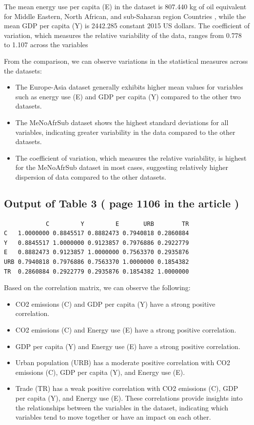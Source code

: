 \documentclass[
  11pt,
]{article}
\providecommand{\tightlist}{%
  \setlength{\itemsep}{0pt}\setlength{\parskip}{0pt}}\usepackage{longtable,booktabs,array}
\begin{document}
The mean energy use per capita (E) in the dataset is 807.440 kg of oil
equivalent for Middle Eastern, North African, and sub-Saharan region
Countries , while the mean GDP per capita (Y) is 2442.285 constant 2015
US dollars. The coefficient of variation, which measures the relative
variability of the data, ranges from 0.778 to 1.107 across the variables

From the comparison, we can observe variations in the statistical
measures across the datasets:

\begin{itemize}
\tightlist
\item
  The Europe-Asia dataset generally exhibits higher mean values for
  variables such as energy use (E) and GDP per capita (Y) compared to
  the other two datasets.
\item
  The MeNoAfrSub dataset shows the highest standard deviations for all
  variables, indicating greater variability in the data compared to the
  other datasets.
\item
  The coefficient of variation, which measures the relative variability,
  is highest for the MeNoAfrSub dataset in most cases, suggesting
  relatively higher dispersion of data compared to the other datasets.
\end{itemize}

\hypertarget{output-of-table-3-page-1106-in-the-article}{%
\subsection{Output of Table 3 ( page 1106 in the article
)}\label{output-of-table-3-page-1106-in-the-article}}

\begin{verbatim}
            C         Y         E       URB        TR
C   1.0000000 0.8845517 0.8882473 0.7940818 0.2860884
Y   0.8845517 1.0000000 0.9123857 0.7976886 0.2922779
E   0.8882473 0.9123857 1.0000000 0.7563370 0.2935876
URB 0.7940818 0.7976886 0.7563370 1.0000000 0.1854382
TR  0.2860884 0.2922779 0.2935876 0.1854382 1.0000000
\end{verbatim}

Based on the correlation matrix, we can observe the following:

\begin{itemize}
\tightlist
\item
  CO2 emissions (C) and GDP per capita (Y) have a strong positive
  correlation.
\item
  CO2 emissions (C) and Energy use (E) have a strong positive
  correlation.
\item
  GDP per capita (Y) and Energy use (E) have a strong positive
  correlation.
\item
  Urban population (URB) has a moderate positive correlation with CO2
  emissions (C), GDP per capita (Y), and Energy use (E).
\item
  Trade (TR) has a weak positive correlation with CO2 emissions (C), GDP
  per capita (Y), and Energy use (E). These correlations provide
  insights into the relationships between the variables in the dataset,
  indicating which variables tend to move together or have an impact on
  each other.
\end{itemize}
\end{document}
